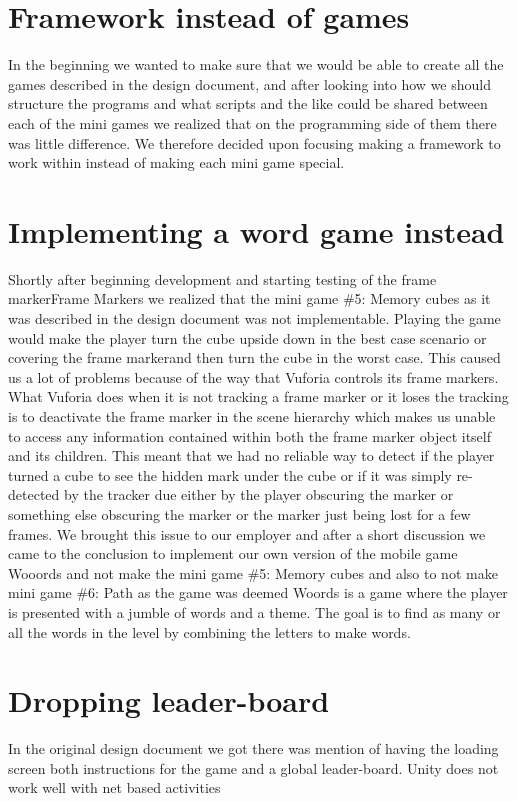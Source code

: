 \section{Framework instead of games}
In the beginning we wanted to make sure that we would be able to create all the games described in the design document, and after looking into how we should structure the programs and what scripts and the like could be shared between each of the mini games we realized that on the programming side of them there was little difference. We therefore decided upon focusing making a framework to work within instead of making each mini game special.

\section{Implementing a word game instead}
Shortly after beginning development and starting testing of the frame marker\gls{Frame Marker}s we realized that the mini game \#5: Memory cubes as it was described in the design document was not implementable. Playing the game would make the player turn the cube upside down in the best case scenario or covering the frame markerand then turn the cube in the worst case. This caused us a lot of problems because of the way that Vuforia controls its frame markers. What Vuforia does when it is not tracking a frame marker or it loses the tracking is to deactivate the frame marker in the scene hierarchy which makes us unable to access any information contained within both the frame marker object itself and its children. This meant that we had no reliable way to detect if the player turned a cube to see the hidden mark under the cube or if it was simply re-detected by the tracker due either by the player obscuring the marker or something else obscuring the marker or the marker just being lost for a few frames. We brought this issue to our employer and after a short discussion we came to the conclusion to implement our own version of the mobile game Wooords and not make the mini game \#5: Memory cubes and also to not make mini game \#6: Path as the game was deemed %
Woords is a game where the player is presented with a jumble of words and a theme. The goal is to find as many or all the words in the level by combining the letters to make words.


\section{Dropping leader-board}
In the original design document we got there was mention of having the loading screen both instructions for the game and a global leader-board. Unity does not work well with net based activities 

